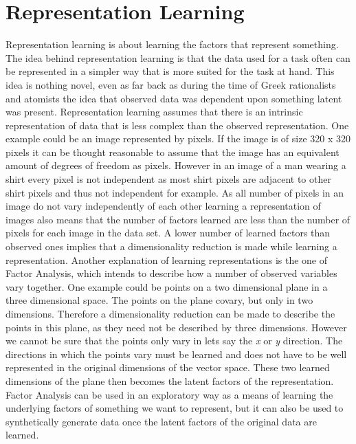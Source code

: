 \documentclass[a4paper,11pt]{kth-mag}
\begin{document}
\chapter{Representation Learning}
Representation learning is about learning the factors that represent something. The idea behind representation learning is that the data used for a task often can be represented in a simpler way that is more suited for the task at hand\cite{bengio2013representation}. This idea is nothing novel, even as far back as during the time of Greek rationalists and atomists the idea that observed data was dependent upon something latent was present\cite{mulaik1987brief}. Representation learning assumes that there is an intrinsic representation of data that is less complex than the observed representation. One example could be an image represented by pixels. If the image is of size 320 x 320 pixels it can be thought reasonable to assume that the image has an equivalent amount of degrees of freedom as pixels. However in an image of a man wearing a shirt every pixel is not independent as most shirt pixels are adjacent to other shirt pixels and thus not independent for example. As all number of pixels in an image do not vary independently of each other learning a representation of images also means that the number of factors learned are less than the number of pixels for each image in the data set. A lower number of learned factors than observed ones implies that a dimensionality reduction is made while learning a representation. 
Another explanation of learning representations is the one of Factor Analysis, which intends to describe how a number of observed variables vary together. One example could be points on a two dimensional plane in a three dimensional space. The points on the plane covary, but only in two dimensions. Therefore a dimensionality reduction can be made to describe the points in this plane, as they need not be described by three dimensions. However we cannot be sure that the points only vary in lets say the \textit{x} or \textit{y} direction. The directions in which the points vary must be learned and does not have to be well represented in the original dimensions of the vector space. These two learned dimensions of the plane then becomes the latent factors of the representation.
Factor Analysis can be used in an exploratory way as a means of learning the underlying factors of something we want to represent, but it can also be used to synthetically generate data once the latent factors of the original data are learned.
\end{document}
